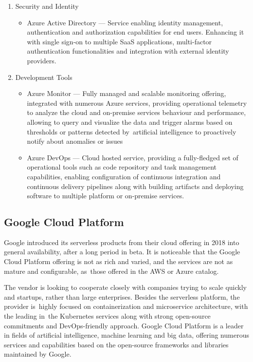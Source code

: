 \begin{enumerate}
   \item Security and Identity
   \begin{itemize}
       \item Azure Active Directory --- Service enabling identity management, authentication and authorization capabilities for end users. Enhancing it with single sign-on to multiple SaaS applications, multi-factor authentication functionalities and integration with external identity providers.
   \end{itemize}
   \item Development Tools
   \begin{itemize}
       \item Azure Monitor --- Fully managed and scalable monitoring offering, integrated with numerous Azure services, providing operational telemetry to analyze the cloud and on-premise services behaviour and performance, allowing to query and visualize the data and trigger alarms based on thresholds or patterns detected by~artificial intelligence to proactively notify about anomalies or issues
       \item Azure DevOps --- Cloud hosted service, providing a fully-fledged set of operational tools such as code repository and task management capabilities, enabling configuration of continuous integration and continuous delivery pipelines along with building artifacts and deploying software to multiple platform or on-premise services.
   \end{itemize}
\end{enumerate}

\subsection{Google Cloud Platform}

Google introduced its serverless products from their cloud offering in 2018 into general availability, after a long period in beta. It is noticeable that the Google Cloud Platform offering is not as rich and varied, and the services are not as mature and configurable, as~those offered in the AWS or Azure catalog.

The vendor is looking to cooperate closely with companies trying to scale quickly and startups, rather than large enterprises. Besides the serverless platform, the provider is~highly focused on containerization and microservice architecture, with the leading in~the Kubernetes services along with strong open-source commitments and DevOps-friendly approach. Google Cloud Platform is a leader in fields of artificial intelligence, machine learning and big data, offering numerous services and capabilities based on the open-source frameworks and libraries maintained by Google.

